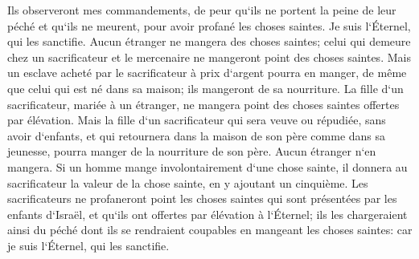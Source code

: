 \verse Ils observeront mes commandements, de peur qu`ils ne portent la peine de leur péché et qu`ils ne meurent, pour avoir profané les choses saintes. Je suis l`Éternel, qui les sanctifie. 
\verse Aucun étranger ne mangera des choses saintes; celui qui demeure chez un sacrificateur et le mercenaire ne mangeront point des choses saintes. 
\verse Mais un esclave acheté par le sacrificateur à prix d`argent pourra en manger, de même que celui qui est né dans sa maison; ils mangeront de sa nourriture. 
\verse La fille d`un sacrificateur, mariée à un étranger, ne mangera point des choses saintes offertes par élévation. 
\verse Mais la fille d`un sacrificateur qui sera veuve ou répudiée, sans avoir d`enfants, et qui retournera dans la maison de son père comme dans sa jeunesse, pourra manger de la nourriture de son père. Aucun étranger n`en mangera. 
\verse Si un homme mange involontairement d`une chose sainte, il donnera au sacrificateur la valeur de la chose sainte, en y ajoutant un cinquième. 
\verse Les sacrificateurs ne profaneront point les choses saintes qui sont présentées par les enfants d`Israël, et qu`ils ont offertes par élévation à l`Éternel; 
\verse ils les chargeraient ainsi du péché dont ils se rendraient coupables en mangeant les choses saintes: car je suis l`Éternel, qui les sanctifie. 
